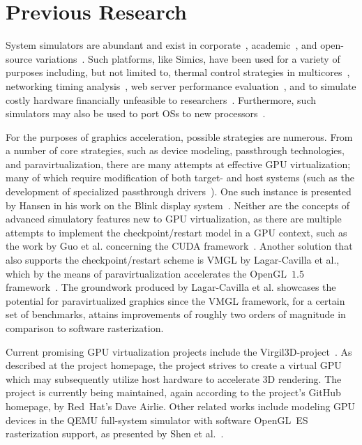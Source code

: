 
\section{Previous Research}
\label{sec:previousresearch}

System simulators are abundant and exist in corporate~, academic~, and open-source variations~.
Such platforms, like Simics, have been used for a variety of purposes including, but not limited to, thermal control strategies in multicores~, networking timing analysis~, web server performance evaluation~, and to simulate costly hardware financially unfeasible to researchers~.
Furthermore, such simulators may also be used to port OSs to new processors~.

For the purposes of graphics acceleration, possible strategies are numerous.
From a number of core strategies, such as device modeling, passthrough technologies, and paravirtualization, there are many attempts at effective GPU virtualization; many of which require modification of both target- and host systems (such as the development of specialized passthrough drivers~).
One such instance is presented by Hansen in his work on the Blink display system~.
Neither are the concepts of advanced simulatory features new to GPU virtualization, as there are multiple attempts to implement the checkpoint/restart model in a GPU context, such as the work by Guo et al. concerning the CUDA framework~.
Another solution that also supports the checkpoint/restart scheme is VMGL by Lagar-Cavilla et al., which by the means of paravirtualization accelerates the OpenGL~$1.5$ framework~.
The groundwork produced by Lagar-Cavilla et al. showcases the potential for paravirtualized graphics since the VMGL framework, for a certain set of benchmarks, attains improvements of roughly two orders of magnitude in comparison to software rasterization.

Current promising GPU virtualization projects include the Virgil3D-project~.
As described at the project homepage, the project strives to create a virtual GPU which may subsequently utilize host hardware to accelerate 3D rendering.
The project is currently being maintained, again according to the project's GitHub homepage, by Red~Hat's Dave Airlie.
Other related works include modeling GPU devices in the QEMU full-system simulator with software OpenGL~ES rasterization support, as presented by Shen et al.~.

